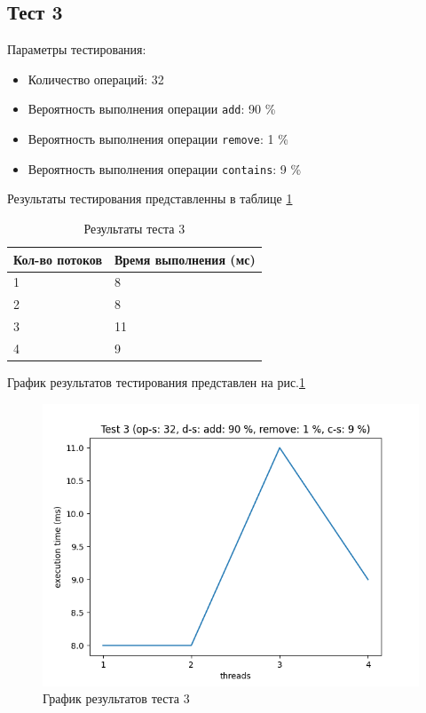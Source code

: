 \subsection*{Тест 3}

Параметры тестирования:

\begin{itemize}
    \item Количество операций: 32
    \item Вероятность выполнения операции \verb|add|: 90 \%
    \item Вероятность выполнения операции \verb|remove|: 1 \%
    \item Вероятность выполнения операции \verb|contains|: 9 \%
\end{itemize}

Результаты тестирования представленны в таблице \ref{tab:results3}


\begin{table}[H]
    \centering
    \begin{tabular}{|l|l|}
        \hline
        Кол-во потоков & Время выполнения (мс) \\
        \hline
        1 & 8 \\
        \hline
        2 & 8 \\
        \hline
        3 & 11 \\
        \hline
        4 & 9 \\
        \hline
    \end{tabular}
    \caption{Результаты теста 3}
    \label{tab:results3}
\end{table}
        

График результатов тестирования представлен на рис.\ref{fig:plot3}

\begin{figure}[H]
    \centering
    \includegraphics[width=0.7\linewidth]{photo/plot3}
    \caption{График результатов теста 3}
    \label{fig:plot3}
\end{figure}

